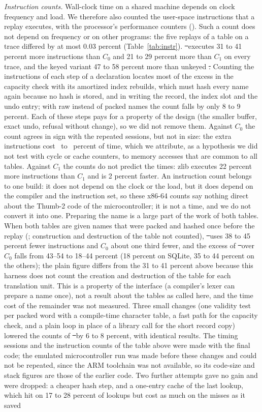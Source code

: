 \emph{Instruction counts.} Wall-clock time on a shared machine depends on clock frequency and load. We therefore also counted the user-space instructions that a replay executes, with the processor's performance counters (). Such a count does not depend on frequency or on other programs: the five replays of a table on a trace differed by at most 0.03 percent (Table~\ref{tab:instr}). \st\ executes 31 to 41 percent more instructions than $C_0$ and 21 to 29 percent more than $C_1$ on every trace, and the keyed variant 47 to 58 percent more than unkeyed \st. Counting the instructions of each step of a declaration locates most of the excess in the capacity check with its amortized index rebuilds, which must hash every name again because no hash is stored, and in writing the record, the index slot and the undo entry; with raw instead of packed names the count falls by only 8 to 9 percent. Each of these steps pays for a property of the design (the smaller buffer, exact undo, refusal without change), so we did not remove them. Against $C_0$ the count agrees in sign with the repeated sessions, but not in size: the extra instructions cost \SessSZeroLo\ to \SessSZeroHi\ percent of time, which we attribute, as a hypothesis we did not test with cycle or cache counters, to memory accesses that are common to all tables. Against $C_1$ the counts do not predict the times: zlib executes 22 percent more instructions than $C_1$ and is 2 percent faster. An instruction count belongs to one build: it does not depend on the clock or the load, but it does depend on the compiler and the instruction set, so these x86-64 counts say nothing direct about the Thumb-2 code of the microcontroller; it is not a time, and we do not convert it into one. Preparing the name is a large part of the work of both tables. When both tables are given names that were packed and hashed once before the replay (; construction and destruction of the table not counted), \st\ uses 38 to 45 percent fewer instructions and $C_0$ about one third fewer, and the excess of \st\ over $C_0$ falls from 43--54 to 18--44 percent (18 percent on SQLite, 35 to 44 percent on the others); the plain figure differs from the 31 to 41 percent above because this harness does not count the creation and destruction of the table for each translation unit. This is a property of the interface (a compiler's lexer can prepare a name once), not a result about the tables as called here, and the time cost of the remainder was not measured. Three small changes (one validity test per packed word with a compile-time character table, a fast path for the capacity check, and a plain loop in place of a library call for the short record copy) lowered the counts of \st\ by 6 to 8 percent, with identical results. The timing sessions and the instruction counts of the table above were made with the final code; the emulated microcontroller run was made before these changes and could not be repeated, since the ARM toolchain was not available, so its code-size and stack figures are those of the earlier code. Two further attempts gave no gain and were dropped: a cheaper hash step, and a one-entry cache of the last lookup, which hit on 17 to 28 percent of lookups but cost as much on the misses as it saved 